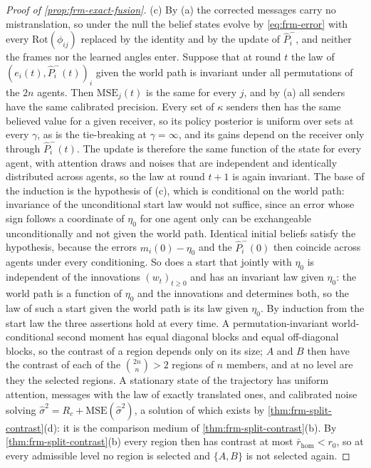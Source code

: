 \begin{proof}[Proof of \cref{prop:frm-exact-fusion}]
(c) By (a) the corrected messages carry no mistranslation, so under the null the belief states evolve by \eqref{eq:frm-error} with every $\mathrm{Rot}(\phi_{ij})$ replaced by the identity and by the update of $\hat P^-_i$, and neither the frames nor the learned angles enter. Suppose that at round $t$ the law of $(e_i(t),\hat P^-_i(t))_i$ given the world path is invariant under all permutations of the $2n$ agents. Then $\mathrm{MSE}_j(t)$ is the same for every $j$, and by (a) all senders have the same calibrated precision. Every set of $\kappa$ senders then has the same believed value for a given receiver, so its policy posterior is uniform over sets at every $\gamma$, as is the tie-breaking at $\gamma=\infty$, and its gains depend on the receiver only through $\hat P^-_i(t)$. The update is therefore the same function of the state for every agent, with attention draws and noises that are independent and identically distributed across agents, so the law at round $t+1$ is again invariant. The base of the induction is the hypothesis of (c), which is conditional on the world path: invariance of the unconditional start law would not suffice, since an error whose sign follows a coordinate of $\eta_0$ for one agent only can be exchangeable unconditionally and not given the world path. Identical initial beliefs satisfy the hypothesis, because the errors $m_i(0)-\eta_0$ and the $\hat P^-_i(0)$ then coincide across agents under every conditioning. So does a start that jointly with $\eta_0$ is independent of the innovations $(w_t)_{t\ge0}$ and has an invariant law given $\eta_0$: the world path is a function of $\eta_0$ and the innovations and determines both, so the law of such a start given the world path is its law given $\eta_0$. By induction from the start law the three assertions hold at every time. A permutation-invariant world-conditional second moment has equal diagonal blocks and equal off-diagonal blocks, so the contrast of a region depends only on its size; $A$ and $B$ then have the contrast of each of the $\binom{2n}{n}>2$ regions of $n$ members, and at no level are they the selected regions. A stationary state of the trajectory has uniform attention, messages with the law of exactly translated ones, and calibrated noise solving $\hat\sigma^2=R_c+\mathrm{MSE}(\hat\sigma^2)$, a solution of which exists by \cref{thm:frm-split-contrast}(d): it is the comparison medium of \cref{thm:frm-split-contrast}(b). By \cref{thm:frm-split-contrast}(b) every region then has contrast at most $\bar r_{\mathrm{hom}}<r_0$, so at every admissible level no region is selected and $\{A,B\}$ is not selected again.
\end{proof}
